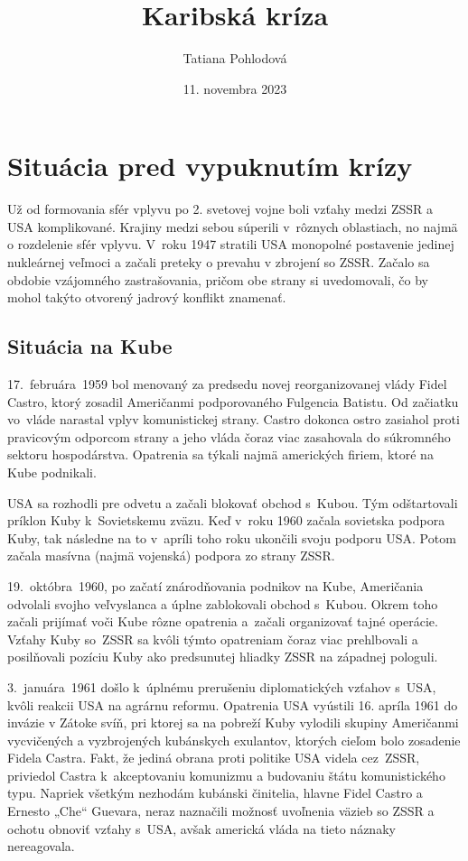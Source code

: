\documentclass[a4paper]{article}
\title{Karibská kríza}
\author{Tatiana Pohlodová}
\date{11. novembra 2023}
\begin{document}
\shorthandoff{-}
\setcounter{page}{0}


\maketitle
\section{Situácia pred vypuknutím krízy}
Už od formovania sfér vplyvu po 2. svetovej vojne boli vzťahy medzi ZSSR a USA komplikované. Krajiny medzi sebou súperili v~rôznych oblastiach, no najmä o rozdelenie sfér vplyvu. V~roku 1947 stratili USA monopolné postavenie jedinej nukleárnej veľmoci a začali preteky o prevahu v zbrojení so ZSSR. Začalo sa obdobie vzájomného zastrašovania, pričom obe strany si uvedomovali, čo by mohol takýto otvorený jadrový konflikt znamenať.

\subsection{Situácia na Kube}
17.~februára~1959 bol menovaný za predsedu novej reorganizovanej vlády Fidel Castro, ktorý zosadil Američanmi podporovaného Fulgencia Batistu. Od začiatku vo~vláde narastal vplyv komunistickej strany. \cite{mintomid} Castro dokonca ostro zasiahol proti pravicovým odporcom strany a jeho vláda čoraz viac zasahovala do súkromného sektoru hospodárstva. Opatrenia sa týkali najmä amerických firiem, ktoré na Kube podnikali.

USA sa rozhodli pre odvetu a začali blokovať obchod s~Kubou. Tým odštartovali príklon Kuby k~Sovietskemu zväzu. Keď v~roku 1960 začala sovietska podpora Kuby, tak následne na to v~apríli toho roku ukončili svoju podporu USA. Potom začala masívna (najmä vojenská) podpora zo strany ZSSR.

19.~októbra~1960, po začatí znárodňovania podnikov na Kube, Američania odvolali svojho veľvyslanca a úplne zablokovali obchod s~Kubou. Okrem toho začali prijímať voči Kube rôzne opatrenia a~začali organizovať tajné operácie. Vzťahy Kuby so~ZSSR sa kvôli týmto opatreniam čoraz viac prehlbovali a posilňovali pozíciu Kuby ako predsunutej hliadky ZSSR na západnej pologuli. \cite{mintomid}

3.~januára~1961 došlo k~úplnému prerušeniu diplomatických vzťahov s~USA, kvôli reakcii USA na agrárnu reformu. Opatrenia USA vyústili 16. apríla 1961 do invázie v Zátoke svíň, pri ktorej sa na pobreží Kuby vylodili skupiny Američanmi vycvičených a vyzbrojených kubánskych exulantov, ktorých cieľom bolo zosadenie Fidela Castra. \cite{13days} Fakt, že jediná obrana proti politike USA videla cez~ZSSR, priviedol Castra k~akceptovaniu komunizmu a budovaniu štátu komunistického typu. Napriek všetkým nezhodám kubánski činitelia, hlavne Fidel Castro a Ernesto „Che“ Guevara, neraz naznačili možnosť uvoľnenia väzieb so ZSSR a ochotu obnoviť vzťahy s~USA, avšak americká vláda na tieto náznaky nereagovala.
\end{document}
